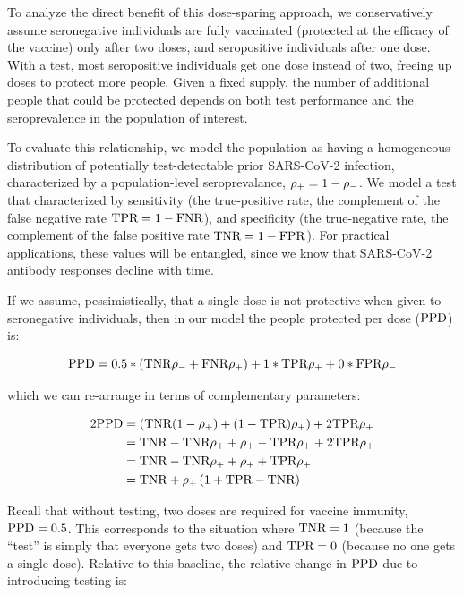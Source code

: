 \documentclass[10pt,a4paper,twocolumn]{article}
\begin{document}
To analyze the direct benefit of this dose-sparing approach, we conservatively assume seronegative individuals are fully vaccinated (\ie* protected at the efficacy of the vaccine) only after two doses, and seropositive individuals after one dose. With a test, most seropositive individuals get one dose instead of two, freeing up doses to protect more people. Given a fixed supply, the number of additional people that could be protected depends on both test performance and the seroprevalence in the population of interest.

To evaluate this relationship, we model the population as having a homogeneous distribution of potentially test-detectable prior SARS-CoV-2 infection,  characterized by a population-level seroprevalance, $\rho_{{+}} = 1 - \rho_{{-}}$. We model a test that characterized by sensitivity (the true-positive rate, the complement of the false negative rate $\textrm{TPR} = 1 - \textrm{FNR}$), and specificity (the true-negative rate, the complement of the false positive rate $\textrm{TNR} = 1 - \textrm{FPR}$). For practical applications, these values will be entangled, since we know that \eg* SARS-CoV-2 antibody responses decline with time\cite{HARRIS2021}.

If we assume, pessimistically, that a single dose is not protective when given to seronegative individuals, then in our model the people protected per dose ($\textrm{PPD}$) is:

$$
\textrm{PPD} = 0.5*\left(\textrm{TNR}\rho_{{-}} + \textrm{FNR}\rho_{{+}}\right) + 1*\textrm{TPR}\rho_{{+}} + 0*\textrm{FPR}\rho_{{-}}
$$

which we can re-arrange in terms of complementary parameters:

\begin{equation}\label{ppd}
\begin{aligned}
2\textrm{PPD} &= \left(\textrm{TNR}(1-\rho_{{+}}) + (1-\textrm{TPR})\rho_{{+}}\right) + 2\textrm{TPR}\rho_{{+}} \\
&= \textrm{TNR}-\textrm{TNR}\rho_{{+}} + \rho_{{+}} - \textrm{TPR}\rho_{{+}} + 2\textrm{TPR}\rho_{{+}} \\
&= \textrm{TNR} - \textrm{TNR}\rho_{{+}} + \rho_{{+}} + \textrm{TPR}\rho_{{+}} \\
&= \textrm{TNR} + \rho_{{+}}\left(1 + \textrm{TPR}-\textrm{TNR}\right)
\end{aligned}
\end{equation}

Recall that without testing, two doses are required for vaccine immunity, \ie* $\textrm{PPD}=0.5$. This corresponds to the situation where $\textrm{TNR}=1$ (because the ``test'' is simply that everyone gets two doses) and $\textrm{TPR}=0$ (because no one gets a single dose). Relative to this baseline, the relative change in $\textrm{PPD}$ due to introducing testing is:
\end{document}
